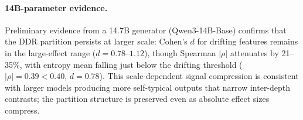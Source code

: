 \paragraph{14B-parameter evidence.}
Preliminary evidence from a 14.7B generator (Qwen3-14B-Base) confirms that the DDR partition persists at larger scale: Cohen's $d$ for drifting features remains in the large-effect range ($d{=}0.78$--$1.12$), though Spearman $|\rho|$ attenuates by 21--35\%, with entropy mean falling just below the drifting threshold ($|\rho|{=}0.39 < 0.40$, $d{=}0.78$).
This scale-dependent signal compression is consistent with larger models producing more self-typical outputs that narrow inter-depth contrasts; the partition structure is preserved even as absolute effect sizes compress.
